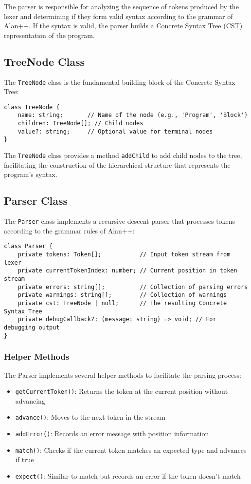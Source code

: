 \documentclass[12pt]{article}
\begin{document}
The parser is responsible for analyzing the sequence of tokens produced by the lexer and determining if they form valid syntax according to the grammar of Alan++. If the syntax is valid, the parser builds a Concrete Syntax Tree (CST) representation of the program.

\subsection{TreeNode Class}
The \texttt{TreeNode} class is the fundamental building block of the Concrete Syntax Tree:

\begin{lstlisting}
class TreeNode {
    name: string;       // Name of the node (e.g., 'Program', 'Block')
    children: TreeNode[]; // Child nodes
    value?: string;     // Optional value for terminal nodes
}
\end{lstlisting}

The \texttt{TreeNode} class provides a method \texttt{addChild} to add child nodes to the tree, facilitating the construction of the hierarchical structure that represents the program's syntax.

\subsection{Parser Class}
The \texttt{Parser} class implements a recursive descent parser that processes tokens according to the grammar rules of Alan++:

\begin{lstlisting}
class Parser {
    private tokens: Token[];           // Input token stream from lexer
    private currentTokenIndex: number; // Current position in token stream
    private errors: string[];          // Collection of parsing errors
    private warnings: string[];        // Collection of warnings
    private cst: TreeNode | null;      // The resulting Concrete Syntax Tree
    private debugCallback?: (message: string) => void; // For debugging output
}
\end{lstlisting}

\subsubsection{Helper Methods}
The Parser implements several helper methods to facilitate the parsing process:

\begin{itemize}
    \item \texttt{getCurrentToken()}: Returns the token at the current position without advancing
    \item \texttt{advance()}: Moves to the next token in the stream
    \item \texttt{addError()}: Records an error message with position information
    \item \texttt{match()}: Checks if the current token matches an expected type and advances if true
    \item \texttt{expect()}: Similar to match but records an error if the token doesn't match
\end{itemize}
\end{document}
